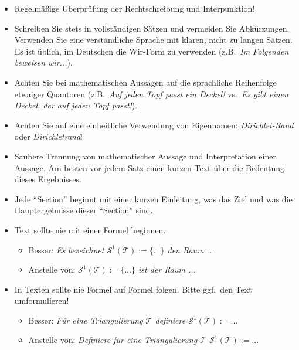 \begin{itemize}

  \item Regelmäßige Überprüfung der Rechtschreibung und Interpunktion!
  \item Schreiben Sie stets in vollständigen Sätzen und vermeiden Sie Abkürzungen.  Verwenden Sie eine verständliche Sprache mit klaren, nicht zu langen Sätzen. Es ist üblich, im Deutschen die Wir-Form zu verwenden (z.B.\ \emph{Im Folgenden beweisen wir...}).

  \item Achten Sie bei mathematischen Aussagen auf die sprachliche Reihenfolge etwaiger Quantoren (z.B.\ \emph{Auf jeden Topf passt ein Deckel!} vs.\ \emph{Es gibt einen Deckel, der auf jeden Topf passt!}).

  \item Achten Sie auf eine einheitliche Verwendung von Eigennamen: \emph{Dirichlet-Rand} oder \emph{Dirichletrand}!

  \item Saubere Trennung von mathematischer Aussage und Interpretation einer Aussage. Am besten vor jedem Satz einen kurzen Text über die Bedeutung dieses Ergebnisses.
  \item Jede "`Section"' beginnt mit einer kurzen Einleitung, was das Ziel und was die Hauptergebnisse dieser "`Section"' sind.

  \item Text sollte nie mit einer Formel beginnen.
        \begin{itemize}
          \item Besser: \emph{Es bezeichnet $\mathcal{S}^1(\mathcal{T}) := \big\{ ... \big\}$ den Raum ...}
          \item Anstelle von: \emph{$\mathcal{S}^1(\mathcal{T}) := \big\{ ... \big\}$ ist der Raum ...}
        \end{itemize}

  \item In Texten sollte nie Formel auf Formel folgen. Bitte ggf.\ den Text umformulieren!
        \begin{itemize}
          \item Besser: \emph{Für eine Triangulierung $\mathcal{T}$ definiere $\mathcal{S}^1(\mathcal{T}) := ...$}
          \item Anstelle von: \emph{Definiere für eine Triangulierung $\mathcal{T}$ $\mathcal{S}^1(\mathcal{T}) := ...$}
        \end{itemize}


\end{itemize}
